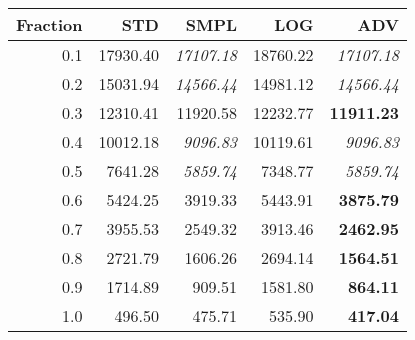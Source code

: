 \documentclass{standalone}
\begin{document}
\begin{tabular}{r|rrrr}
      \toprule
      Fraction & STD & SMPL & LOG & ADV\\
      \midrule
      0.1 & 17930.40 & \emph{17107.18} & 18760.22 & \emph{17107.18}\\
  0.2 & 15031.94 & \emph{14566.44} & 14981.12 & \emph{14566.44}\\
  0.3 & 12310.41 & 11920.58 & 12232.77 & \textbf{11911.23}\\
  0.4 & 10012.18 & \emph{9096.83} & 10119.61 & \emph{9096.83}\\
  0.5 & 7641.28 & \emph{5859.74} & 7348.77 & \emph{5859.74}\\
  0.6 & 5424.25 & 3919.33 & 5443.91 & \textbf{3875.79}\\
  0.7 & 3955.53 & 2549.32 & 3913.46 & \textbf{2462.95}\\
  0.8 & 2721.79 & 1606.26 & 2694.14 & \textbf{1564.51}\\
  0.9 & 1714.89 & 909.51 & 1581.80 & \textbf{864.11}\\
  1.0 & 496.50 & 475.71 & 535.90 & \textbf{417.04}\\
  \bottomrule
\end{tabular}
\end{document}
